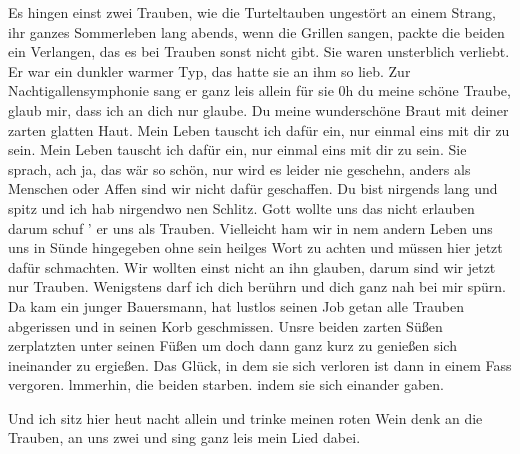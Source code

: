 
\beginverse
Es hingen einst zwei Trauben, wie die Turteltauben
ungestört an einem Strang, ihr ganzes Sommerleben lang
abends, wenn die Grillen sangen, packte die beiden ein Verlangen,
das es bei Trauben sonst nicht gibt. Sie waren unsterblich verliebt.
Er war ein dunkler warmer Typ, das hatte sie an ihm so lieb.
Zur Nachtigallensymphonie sang er ganz leis allein für sie
0h du meine schöne Traube, glaub mir, dass ich an dich nur glaube.
Du meine wunderschöne Braut mit deiner zarten glatten Haut.
\endverse
\beginchorus
Mein Leben tauscht ich dafür ein, nur einmal eins mit dir zu sein.
Mein Leben tauscht ich dafür ein, nur einmal eins mit dir zu sein.
\endchorus
\beginverse
Sie sprach, ach ja, das wär so schön, nur wird es leider nie geschehn,
anders als Menschen oder Affen sind wir nicht dafür geschaffen.
Du bist nirgends lang und spitz und ich hab nirgendwo nen Schlitz.
Gott wollte uns das nicht erlauben darum schuf ' er uns als Trauben.
Vielleicht ham wir in nem andern Leben uns uns in Sünde hingegeben
ohne sein heilges Wort zu achten und müssen hier jetzt dafür schmachten.
Wir wollten einst nicht an ihn glauben, darum sind wir jetzt nur Trauben.
Wenigstens darf ich dich berührn und dich ganz nah bei mir spürn.
\endverse{}
\beginverse
Da kam ein junger Bauersmann, hat lustlos seinen Job getan
alle Trauben abgerissen und in seinen Korb geschmissen.
Unsre beiden zarten Süßen zerplatzten unter seinen Füßen
um doch dann ganz kurz zu genießen sich ineinander zu ergießen.
Das Glück, in dem sie sich verloren ist dann in einem Fass vergoren.
lmmerhin, die beiden starben. indem sie sich einander gaben.

Und ich sitz hier heut nacht allein und trinke meinen roten Wein
denk an die Trauben, an uns zwei und sing ganz leis mein Lied dabei.
\endverse
{}
\endsong
